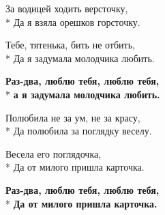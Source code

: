 \medskip

\begin{minipage}{\linewidth}
За водицей ходить версточку,\\*
Да я взяла орешков горсточку.\\
\end{minipage}\par\medskip\nobreak

\medskip

\begin{minipage}{\linewidth}
Тебе, тятенька, бить не отбить,\\*
Да я задумала молодчика любить.\\
\end{minipage}\par\medskip\nobreak

\medskip

\begin{minipage}{\linewidth}
\hspace*{1.5em}\textbf{Раз-два, люблю тебя, люблю тебя,}\\*
\hspace*{1.5em}\textbf{а я задумала молодчика любить.}\\
\end{minipage}\par\medskip\nobreak

\medskip

\begin{minipage}{\linewidth}
Полюбила не за ум, не за красу,\\*
Да полюбила за поглядку веселу.\\
\end{minipage}\par\medskip\nobreak

\medskip

\begin{minipage}{\linewidth}
Весела его поглядочка,\\*
Да от милого пришла карточка.\\
\end{minipage}\par\medskip\nobreak

\medskip

\begin{minipage}{\linewidth}
\hspace*{1.5em}\textbf{Раз-два, люблю тебя, люблю тебя,}\\*
\hspace*{1.5em}\textbf{Да от милого пришла карточка.}\\
\end{minipage}\par\medskip\nobreak


